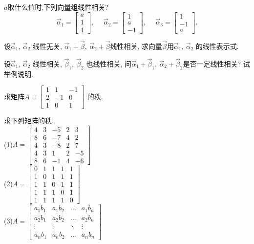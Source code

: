 \begin{ex}\label{4.16}
$a$取什么值时,下列向量组线性相关?
\begin{displaymath}\vec{\alpha}_1=\begin{bmatrix}a\\1\\1\end{bmatrix},\ \ \ \  \ \  \vec{\alpha}_2=\begin{bmatrix}1\\a\\-1\end{bmatrix},\ \ \ \     \ \ \vec{\alpha}_3=\begin{bmatrix}1\\-1\\a\end{bmatrix}.
\end{displaymath}
\end{ex}

\begin{ex}\label{4.17}
设$\vec{\alpha}_1,\ \vec{\alpha}_2$ 线性无关, $\vec{\alpha}_1+\vec{\beta}, \ \vec{\alpha}_2+\vec{\beta}$线性相关,
求向量$\vec{\beta}$用$\vec{\alpha}_1,\ \vec{\alpha}_2$ 的线性表示式.
\end{ex}

\begin{ex}\label{4.18}
设$\vec{\alpha}_1,\ \vec{\alpha}_2$ 线性相关, $\vec{\beta}_1,\ \vec{\beta}_2$ 也线性相关,
问$\vec{\alpha}_1+\vec{\beta}_1,\ \vec{\alpha}_2+\vec{\beta}_2$是否一定线性相关? 试举例说明.
\end{ex}

\begin{ex}\label{4.19}
求矩阵$A=\begin{bmatrix}1&1&-1\\2&-1&0\\1&0&1\end{bmatrix}$ 的秩.
\end{ex}

\begin{ex}\label{4.20}
求下列矩阵的秩.\\
(1)$A=\left[\begin{array}{ccccc}4&3&-5&2&3\\8&6&-7&4&2\\4&3&-8&2&7\\4&3&1&2&-5\\8&6&-1&4&-6\end{array}\right] $\\
(2)$A=\left[\begin{array}{ccccc}0&1&1&1&1\\1&0&1&1&1\\1&1&0&1&1\\ 1&1&1&0&1\\1&1&1&1&0\end{array}\right]$\\
(3)$A=\begin{bmatrix}a_1b_1 & a_1b_2& \dots & a_1b_n\\a_2b_1 &a_2b_2& \dots & a_2b_n\\ \vdots & \vdots &\ddots  &\vdots \\ a_nb_1 &a_nb_2 &\dots& a_nb_n\end{bmatrix}$
\end{ex}

